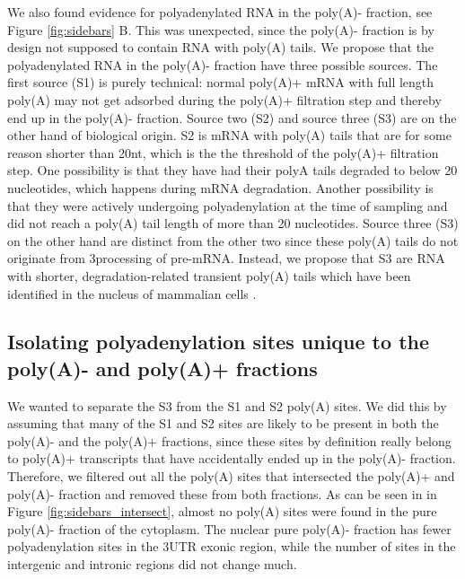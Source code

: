 We also found evidence for polyadenylated RNA in the poly(A)- fraction, see
Figure \ref{fig:sidebars} B. This was unexpected, since the poly(A)- fraction
is by design not supposed to contain RNA with poly(A) tails. We propose that
the polyadenylated RNA in the poly(A)- fraction have three possible sources.
The first source (S1) is purely technical: normal poly(A)+ mRNA with full
length poly(A) may not get adsorbed during the poly(A)+ filtration step and
thereby end up in the poly(A)- fraction. Source two (S2) and source three (S3)
are on the other hand of biological origin. S2 is mRNA with poly(A) tails that
are for some reason shorter than 20nt, which is the the threshold of the
poly(A)+ filtration step. One possibility is that they have had their polyA
tails degraded to below 20 nucleotides, which happens during mRNA degradation.
Another possibility is that they were actively undergoing polyadenylation at
the time of sampling and did not reach a poly(A) tail length of more than 20
nucleotides. Source three (S3) on the other hand are distinct from the other
two since these poly(A) tails do not originate from 3\p processing of pre-mRNA.
Instead, we propose that S3 are RNA with shorter, degradation-related transient
poly(A) tails which have been identified in the nucleus of mammalian cells
\cite{lemay_nuclear_2010}.

\subsection{Isolating polyadenylation sites unique to the poly(A)- and poly(A)+
fractions}
We wanted to separate the S3 from the S1 and S2 poly(A) sites. We did this by
assuming that many of the S1 and S2 sites are likely to be present in both the
poly(A)- and the poly(A)+ fractions, since these sites by definition really
belong to poly(A)+ transcripts that have accidentally ended up in the poly(A)-
fraction.  Therefore, we filtered out all the poly(A) sites that intersected
the poly(A)+ and poly(A)- fraction and removed these from both fractions. As
can be seen in in Figure \ref{fig:sidebars_intersect}, almost no poly(A) sites
were found in the pure poly(A)- fraction of the cytoplasm. The nuclear pure
poly(A)- fraction has fewer polyadenylation sites in the 3\p UTR exonic region,
while the number of sites in the intergenic and intronic regions did not change
much.

